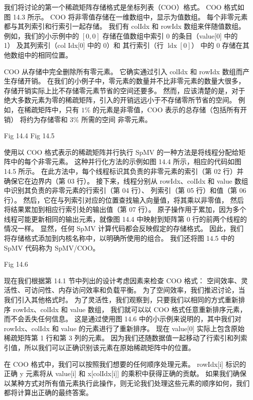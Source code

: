 我们将讨论的第一个稀疏矩阵存储格式是坐标列表（COO）格式。 COO 格式如图 14.3 所示。 
COO 将非零值存储在一维数组中，显示为值数组。 每个非零元素都与其列索引和行索引一起存储。 
我们有 colIdx 和 rowIdx 数组来伴随值数组。 
例如，我们的小示例中的 $[0,0]$ 存储在值数组中索引 0 的条目（value[0] 中的 1）
及其列索引（col Idx[0] 中的 0）和 其行索引（行 $\operatorname{ldx}[0]）$ 中的 0 存储在其他数组中的相同位置。

COO 从存储中完全删除所有零元素。 它确实通过引入 colIdx 和 rowIdx 数组而产生存储开销。 
在我们的小例子中，零元素的数量并不比非零元素的数量大很多，存储开销实际上比不存储零元素节省的空间还要多。 
然而，应该清楚的是，对于绝大多数元素为零的稀疏矩阵，引入的开销远远小于不存储零所节省的空间。 
例如，在稀疏矩阵中，只有 $1 \%$ 的元素是非零值，COO 表示的总存储（包括所有开销）
将约为存储零和 $3 \%$ 所需的空间 非零元素。

{\color{red} Fig 14.4}
{\color{red} Fig 14.5}

使用以 COO 格式表示的稀疏矩阵并行执行 SpMV 的一种方法是将线程分配给矩阵中的每个非零元素。 
这种并行化方法的示例如图 14.4 所示，相应的代码如图 14.5 所示。 
在此方法中，每个线程标识其负责的非零元素的索引（第 02 行）并确保它在边界内（第 03 行）。 
接下来，线程分别从 rowIdx、colIdx 和 value 数组中识别其负责的非零元素的行索引（第 04 行）、
列索引（第 05 行）和值（第 06 行）。 然后，它在与列索引对应的位置查找输入向量值，将其乘以非零值，
然后将结果累加到相应行索引处的输出值（第 07 行）。 
原子操作用于累加，因为多个线程可能更新相同的输出元素，就像图 14.4 中映射到矩阵第 0 行的前两个线程的情况一样。 
显然，任何 SpMV 计算代码都会反映假定的存储格式。 因此，我们将存储格式添加到内核名称中，以明确所使用的组合。 
我们还将图 14.5 中的 SpMV 代码称为 SpMV/COO。

{\color{red} Fig 14.6}

现在我们根据第 14.1 节中列出的设计考虑因素来检查 $\mathrm{COO}$ 格式：
空间效率、灵活性、可访问性、内存访问效率和负载平衡。 为了空间效率，我们推迟讨论，当我们引入其他格式时。 
为了灵活性，我们观察到，只要我们以相同的方式重新排序 rowIdx、colIdx 和 value 数组，
我们就可以以 $\mathrm{COO}$ 格式任意重新排序元素，而不会丢失任何信息。 
这是通过使用图 14.6 中的小示例来说明的，其中我们对 rowIdx、colIdx 和 value 的元素进行了重新排序。 
现在 value[0] 实际上包含原始稀疏矩阵第 1 行和第 3 列的元素。 
因为我们还随数据值一起移动了行索引和列索引值，所以我们可以正确识别该元素在原始稀疏矩阵中的位置。

在 COO 格式中，我们可以按照我们想要的任何顺序处理元素。 
rowIdx[i] 标识的正确 y 元素将从 value[i] 和 x[colIdx[i]] 的乘积中获得正确的贡献。 
如果我们确保以某种方式对所有值元素执行此操作，则无论我们处理这些元素的顺序如何，我们都将计算出正确的最终答案。

